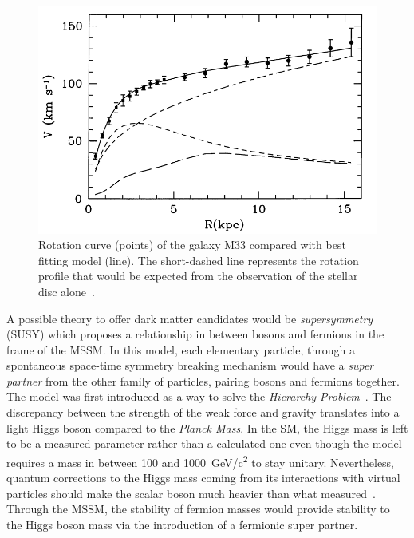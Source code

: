 \endgroup
	
\begingroup\setlength{\intextsep}{0pt}\setlength{\columnsep}{15pt}
	
	\begin{figure}
		\centering
		\includegraphics[width=\linewidth]{fig/chapt2/M33-rotation-curve.png}
		\caption{\label{fig:galaxy} Rotation curve (points) of the galaxy M33 compared with best fitting model (line). The short-dashed line represents the rotation profile that would be expected from the observation of the stellar disc alone~\cite{CORBELLI2000}.}
	\end{figure}
	
	A possible theory to offer dark matter candidates would be \textit{supersymmetry} (SUSY) which proposes a relationship in between bosons and fermions in the frame of the \acf{MSSM}. In this model, each elementary particle, through a spontaneous space-time symmetry breaking mechanism would have a \textit{super partner} from the other family of particles, pairing bosons and fermions together. The model was first introduced as a way to solve the \textit{Hierarchy Problem}~\cite{DIMOPOULOS1981}. The discrepancy between the strength of the weak force and gravity translates into a light Higgs boson compared to the \textit{Planck Mass}. In the SM, the Higgs mass is left to be a measured parameter rather than a calculated one even though the model requires a mass in between 100 and \SI{1000}{GeV/c^2} to stay unitary. Nevertheless, quantum corrections to the Higgs mass coming from its interactions with virtual particles should make the scalar boson much heavier than what measured~\cite{TANEDO2012}. Through the MSSM, the stability of fermion masses would provide stability to the Higgs boson mass via the introduction of a fermionic super partner.
	
